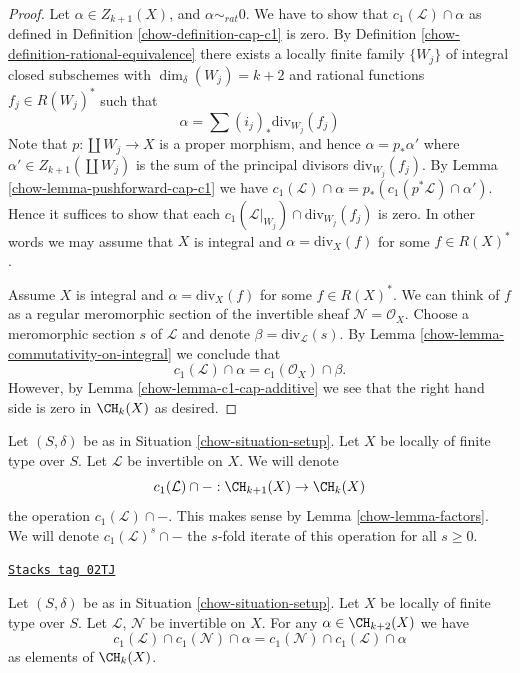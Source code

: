 \begin{proof}

Let $\alpha \in Z_{k + 1}(X)$, and $\alpha \sim_{rat} 0$.
We have to show that $c_1(\mathcal{L}) \cap \alpha$
as defined in Definition \ref{chow-definition-cap-c1} is zero.
By Definition \ref{chow-definition-rational-equivalence} there
exists a locally finite family $\{W_j\}$ of integral closed
subschemes with $\dim_\delta(W_j) = k + 2$ and rational functions
$f_j \in R(W_j)^*$ such that
$$
\alpha = \sum (i_j)_*\text{div}_{W_j}(f_j)
$$
Note that $p : \coprod W_j \to X$ is a proper morphism,
and hence $\alpha = p_*\alpha'$ where $\alpha' \in Z_{k + 1}(\coprod W_j)$
is the sum of the principal divisors $\text{div}_{W_j}(f_j)$.
By Lemma \ref{chow-lemma-pushforward-cap-c1} we have
$c_1(\mathcal{L}) \cap \alpha = p_*(c_1(p^*\mathcal{L}) \cap \alpha')$.
Hence it suffices to show that each
$c_1(\mathcal{L}|_{W_j}) \cap \text{div}_{W_j}(f_j)$ is zero.
In other words we may assume that $X$ is integral and
$\alpha = \text{div}_X(f)$ for some $f \in R(X)^*$.

\medskip\noindent
Assume $X$ is integral and $\alpha = \text{div}_X(f)$ for some $f \in R(X)^*$.
We can think of $f$ as a regular meromorphic section of the invertible
sheaf $\mathcal{N} = \mathcal{O}_X$. Choose a meromorphic section
$s$ of $\mathcal{L}$ and denote $\beta = \text{div}_\mathcal{L}(s)$.
By Lemma \ref{chow-lemma-commutativity-on-integral}
we conclude that
$$
c_1(\mathcal{L}) \cap \alpha = c_1(\mathcal{O}_X) \cap \beta.
$$
However, by Lemma \ref{chow-lemma-c1-cap-additive} we see that the right hand side
is zero in $\CH_k(X)$ as desired.
\end{proof}

Let $(S, \delta)$ be as in Situation \ref{chow-situation-setup}.
Let $X$ be locally of finite type over $S$.
Let $\mathcal{L}$ be invertible on $X$.
We will denote
$$
c_1(\mathcal{L}) \cap - : \CH_{k + 1}(X) \to \CH_k(X)
$$
the operation $c_1(\mathcal{L}) \cap - $. This makes sense by
Lemma \ref{chow-lemma-factors}. We will denote $c_1(\mathcal{L})^s \cap -$
the $s$-fold iterate of this operation for all $s \geq 0$.

\begin{lemma}
\label{chow-lemma-cap-commutative}
\href{https://stacks.math.columbia.edu/tag/02TJ}{\texttt{Stacks tag 02TJ}}

Let $(S, \delta)$ be as in Situation \ref{chow-situation-setup}.
Let $X$ be locally of finite type over $S$.
Let $\mathcal{L}$, $\mathcal{N}$ be invertible on $X$.
For any $\alpha \in \CH_{k + 2}(X)$ we have
$$
c_1(\mathcal{L}) \cap c_1(\mathcal{N}) \cap \alpha
=
c_1(\mathcal{N}) \cap c_1(\mathcal{L}) \cap \alpha
$$
as elements of $\CH_k(X)$.
\end{lemma}

